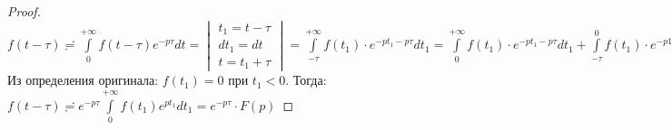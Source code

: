 \begin{proof}
    \ \\
    $f(t-\tau)\risingdotseq \int\limits_0^{+\infty} f(t-\tau)e^{-p\tau}dt = 
    \begin{vmatrix}
        t_1=t-\tau\\
        dt_1=dt\\
        t=t_1+\tau
    \end{vmatrix}
    = \int\limits_{-\tau}^{+\infty}f(t_1)\cdot e^{-pt_1-p\tau}dt_1=\int\limits_0^{+\infty}f(t_1)\cdot e^{-pt_1-p\tau}dt_1+\int\limits_{-\tau}^0 f(t_1)\cdot e^{-p1_1-p\tau}dt_1$\\
    Из определения оригинала: $f(t_1)=0$ при $t_1<0$. Тогда:\\
    $f(t-\tau)\risingdotseq e^{-p\tau}\int\limits_0^{+\infty} f(t_1)e^{pt_1}dt_1 = e^{-p\tau}\cdot F(p)$
\end{proof}
    
